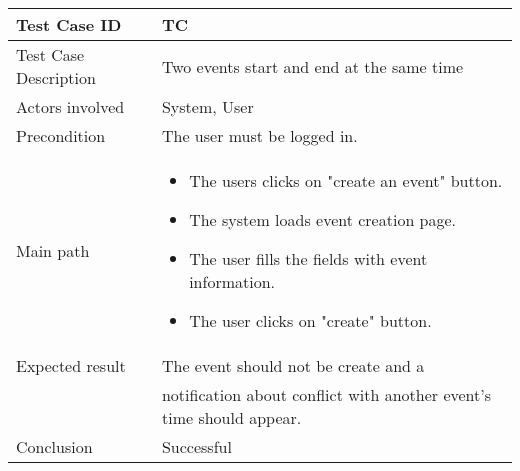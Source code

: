 \begin{center} \begin{tabular}{|l|l|}
  \hline
  Test Case ID & TC \z\\
  \hline
  Test Case Description & Two events start and end at the same time\\
  \hline
  Actors involved & System, User\\
   \hline
  Precondition & The user must be logged in.\\
  \hline
  Main path &   \begin{minipage}{5in}
    \vskip 4pt
            \begin{itemize}
              \item The users clicks on "create an event" button.
              \item The system loads event creation page.
              \item The user fills the fields with event information.
              \item The user clicks on "create" button.
            \end{itemize}
    \vskip 4pt
  \end{minipage}  \\
  \hline
  Expected result & The event should not be create and a\\
  & notification about conflict with another event's time should appear.\\
  \hline
  Conclusion & Successful\\
  \hline
\end{tabular} \end{center}



